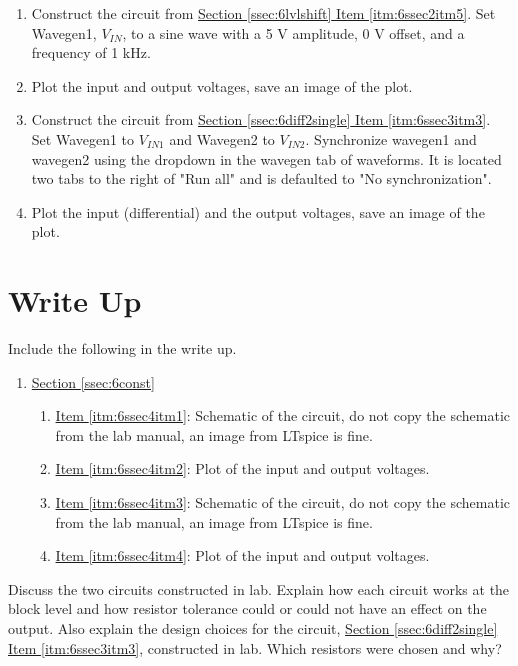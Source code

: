 \begin{enumerate}
	\item Construct the circuit from \hyperref[itm:6ssec2itm5]{Section \ref*{ssec:6lvlshift} Item \ref*{itm:6ssec2itm5}}. Set Wavegen1, $V_{IN}$, to a sine wave with a 5 V amplitude, 0 V offset, and a frequency of 1 kHz. \label{itm:6ssec4itm1}
	\item Plot the input and output voltages, save an image of the plot. \label{itm:6ssec4itm2}
	\item Construct the circuit from \hyperref[itm:6ssec3itm3]{Section \ref*{ssec:6diff2single} Item \ref*{itm:6ssec3itm3}}. Set Wavegen1 to $V_{IN1}$ and Wavegen2 to $V_{IN2}$. \label{itm:6ssec4itm3} Synchronize wavegen1 and wavegen2 using the dropdown in the wavegen tab of waveforms. It is located two tabs to the right of "Run all" and is defaulted to "No synchronization".
	\item Plot the input (differential) and the output voltages, save an image of the plot. \label{itm:6ssec4itm4}
\end{enumerate}



\section{Write Up}

Include the following in the write up.

\begin{enumerate}
	\item \hyperref[ssec:6const]{Section \ref*{ssec:6const}}
		\begin{enumerate}
			\item \hyperref[itm:6ssec4itm1]{Item \ref*{itm:6ssec4itm1}}: Schematic of the circuit, do not copy the schematic from the lab manual, an image from LTspice is fine. 
			\item \hyperref[itm:6ssec4itm2]{Item \ref*{itm:6ssec4itm2}}: Plot of the input and output voltages. 
			\item \hyperref[itm:6ssec4itm1]{Item \ref*{itm:6ssec4itm3}}: Schematic of the circuit, do not copy the schematic from the lab manual, an image from LTspice is fine. 
			\item \hyperref[itm:6ssec4itm2]{Item \ref*{itm:6ssec4itm4}}: Plot of the input and output voltages. 
		\end{enumerate}
\end{enumerate}

Discuss the two circuits constructed in lab. Explain how each circuit works at the block level and how resistor tolerance could or could not have an effect on the output. Also explain the design choices for the circuit, \hyperref[itm:6ssec3itm3]{Section \ref*{ssec:6diff2single} Item \ref*{itm:6ssec3itm3}}, constructed in lab. Which resistors were chosen and why? 
